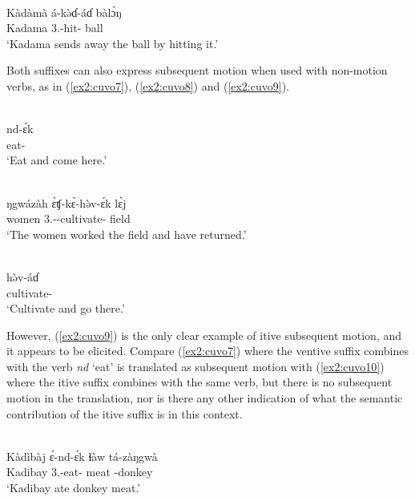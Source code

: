 \ex\label{ex2:cuvo6}
 \\
\gll Kàdàmà	á-kə̀ɗ-áɗ	bàlɔ̀ŋ \\
Kadama	3.-hit-	ball \\
\glt `Kadama sends away the ball by hitting it.'
\z 

Both suffixes can also express subsequent motion when used with non-motion verbs, as in (\ref{ex2:cuvo7}), (\ref{ex2:cuvo8}) and (\ref{ex2:cuvo9}).

\ea\label{ex2:cuvo7}
 \\
\gll  nd-ɛ́k \\
eat- \\
\glt `Eat and come here.'

\ex\label{ex2:cuvo8}
 \\
\gll  ŋgwázàh	ɛ̀ʧ-kɛ̀-hə̀v-ɛ́k	lɛ̀j \\
women	3.--cultivate-	field \\
\glt `The women worked the field and have returned.'

\ex\label{ex2:cuvo9}
 \\
\gll  hə̀v-áɗ \\
cultivate- \\
\glt `Cultivate and go there.'
\z 

However, (\ref{ex2:cuvo9}) is the only clear example of itive subsequent motion, and it appears to be elicited. Compare (\ref{ex2:cuvo7}) where the ventive suffix combines with the verb \textit{nd} ‘eat’ is translated as subsequent motion with (\ref{ex2:cuvo10}) where the itive suffix combines with the same verb, but there is no subsequent motion in the translation, nor is there any other indication of what the semantic contribution of the itive suffix is in this context. 

\ea\label{ex2:cuvo10}
 \\
\gll Kàdìbàj	ɛ́-nd-ɛ́k	ɬàw	tá-zàŋgwà \\
Kadibay	3.-eat-	meat	-donkey \\
\glt `Kadibay ate donkey meat.'
\z 

